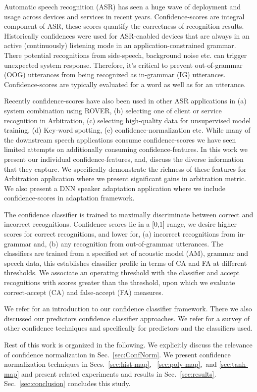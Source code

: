 Automatic speech recognition (ASR) has seen a huge wave of deployment and usage across devices and services in recent years.
Confidence-scores are integral component of ASR, these scores quantify the correctness of recognition results. Historically confidences were used for ASR-enabled devices that are always in an active (continuously) listening mode in an application-constrained grammar. There potential recognitions from side-speech, background noise etc. can trigger unexpected system response. Therefore, it's critical to prevent out-of-grammar (OOG) utterances from being recognized as in-grammar (IG) utterances.
Confidence-scores are typically evaluated for a word as well as for an utterance.

Recently confidence-scores have also been used in other ASR applications in (a) system combination using ROVER, (b) selecting one of client or service recognition in Arbitration, (c) selecting high-quality data for unsupervised model training, (d) Key-word spotting, (e) confidence-normalization etc. While many of the downstream speech applications consume confidence-scores we have seen limited attempts on additionally consuming confidence-features. In this work we present our individual confidence-features, and, discuss the diverse information that they capture. We specifically demonstrate the richness of these features for Arbitration application where we present significant gains in arbitration metric. We also present a DNN speaker adaptation application where we include confidence-scores in adaptation framework.


The confidence classifier is trained to maximally discriminate between correct and incorrect
recognitions. Confidence scores lie in a [0,1] range, we desire higher scores for correct recognitions, and lower for,
(a) incorrect recognitions from in-grammar and, (b) any recognition from out-of-grammar utterances.
The classifiers are trained from a specified set of acoustic model (AM), grammar and speech data, this establishes classifier
profile in terms of CA and FA at different thresholds. We associate an operating threshold with
the classifier and accept recognitions with scores greater than the threshold, upon which we evaluate correct-accept (CA) and false-accept (FA) measures.

We refer \cite{Posen1} for an introduction to our confidence classifier framework. There we
also discussed our predictors confidence classifier approaches.
We refer \cite{CMsurvey_Jiang_SpeechCommunication06, NBest_Wessel_Eurospeech99, MaximumEntropyConfidence_White_ICASSP07,Blatz04confidenceestimation,Rose_UV_1995,Mathan_Rejection_1991,Sukkar_UV_1996}
for a survey of other confidence techniques and specifically \cite{WordLattice_Kemp_Eurospeech97, MaximumEntropyConfidence_White_ICASSP07, Wessel01ney,Chase_wordand,Weintraub97}
for predictors and the classifiers used.

Rest of this work is organized in the following. We explicitly discuss the relevance of 
confidence normalization in Sec.~\ref{sec:ConfNorm}. We present confidence normalization techniques in Secs.~\ref{sec:hist-map}, ~\ref{sec:poly-map},~and \ref{sec:tanh-map} and present 
related experiments and results in Sec.~\ref{sec:results}. Sec.~\ref{sec:conclusion} concludes this study.
